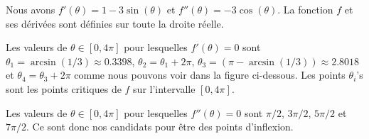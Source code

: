 {

Nous avons $\displaystyle f'(\theta) = 1 - 3\sin(\theta)$ et
$\displaystyle f''(\theta)= -3\cos(\theta)$.  La fonction $f$ et ses dérivées
sont définies sur toute la droite réelle.

Les valeurs de $\theta \in [0, 4\pi]$ pour lesquelles $f'(\theta) = 0$ sont
$\theta_1 = \arcsin(1/3) \approx 0.3398$, $\theta_2 = \theta_1+2\pi$,
$\theta_3 = (\pi -\arcsin(1/3)) \approx 2.8018$ et
$\theta_4 = \theta_3 + 2\pi$ comme nous pouvons voir dans la figure
ci-dessous. Les points $\theta_i$'s sont les points critiques de $f$
sur l'intervalle $[0,4\pi]$.

Les valeurs de $\theta \in [0,4\pi]$ pour lesquelles $f''(\theta)=0$ sont
$\pi/2$, $3\pi/2$, $5\pi/2$ et $7\pi/2$.  Ce sont donc nos candidats pour
être des points d'inflexion.

}
